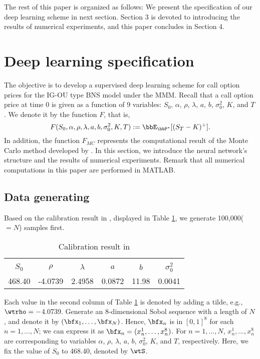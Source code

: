 The rest of this paper is organized as follows: We present the specification of our deep learning scheme in next section.
Section 3 is devoted to introducing the results of numerical experiments, and this paper concludes in Section 4.

\section{Deep learning specification}\setcounter{equation}{0}
The objective is to develop a supervised deep learning scheme for call option prices for the IG-OU type BNS model under the MMM.
Recall that a call option price at time 0 is given as a function of 9 variables: $S_0$, $\alpha$, $\rho$, $\lambda$, $a$, $b$, $\sigma_0^2$, $K$, and $T$.
We denote it by the function $F$, that is,
\[
F(S_0,\alpha,\rho,\lambda,a,b,\sigma_0^2,K,T):=\bbE_{\bbP^*}[(S_T-K)^+].
\]
In addition, the function $F_{MC}$ represents the computational result of the Monte Carlo method developed by \cite{AI}.
In this section, we introduce the neural network's structure and the results of numerical experiments.
Remark that all numerical computations in this paper are performed in MATLAB.

\subsection{Data generating}
Based on the calibration result in \cite{NV}, displayed in Table \ref{tab1}, we generate 100,000($=N$) samples first.

\begin{table}[h]
\begin{center}\caption{Calibration result in \cite{NV}}\label{tab1}
\begin{tabular}{cccccc}\hline \vspace{-3.5mm} \\
$S_0$  & $\rho$  & $\lambda$ & $a$    & $b$   & $\sigma_0^2$ \\ \hline \hline
468.40 & -4.0739 & 2.4958    & 0.0872 & 11.98 & 0.0041       \\ \hline
\end{tabular}\end{center}\end{table}

\noindent
Each value in the second column of Table \ref{tab1} is denoted by adding a tilde, e.g., $\wtrho=-$4.0739.
Generate an 8-dimensional Sobol sequence with a length of $N$, and denote it by $(\bfx_1,\dots,\bfx_N)$.
Hence, $\bfx_n$ is in $[0,1]^8$ for each $n=1,\dots,N$; we can express it as $\bfx_n=(x^1_n,\dots,x^8_n)$.
For $n=1,\dots,N$, $x^1_n,\dots,x^8_n$ are corresponding to variables $\alpha$, $\rho$, $\lambda$, $a$, $b$, $\sigma_0^2$, $K$, and $T$, respectively.
Here, we fix the value of $S_0$ to 468.40, denoted by $\wtS$.

